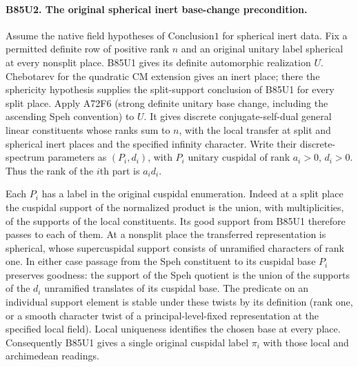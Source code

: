 \paragraph{B85U2. The original spherical inert base-change precondition.}
Assume the native field hypotheses of $\mathrm{Conclusion1}$ for
spherical inert data. Fix a permitted definite row of positive rank
$n$ and an original unitary label spherical at every nonsplit place.
B85U1 gives its definite automorphic realization $U$. Chebotarev for
the quadratic CM extension gives an inert place; there the
sphericity hypothesis supplies the split-support conclusion of
B85U1 for every split place. Apply A72F6 (strong definite unitary
base change, including the ascending Speh convention) to $U$.
It gives discrete conjugate-self-dual general linear constituents
whose ranks sum to $n$, with the local transfer at split and
spherical inert places and the specified infinity character.
Write their discrete-spectrum parameters as $(P_i,d_i)$, with
$P_i$ unitary cuspidal of rank $a_i>0$, $d_i>0$. Thus the rank
of the $i$th part is $a_i d_i$.

Each $P_i$ has a label in the original cuspidal enumeration.
Indeed at a split place the cuspidal support of the normalized
product is the union, with multiplicities, of the supports of the
local constituents. Its good support from B85U1 therefore passes
to each of them. At a nonsplit place the transferred representation
is spherical, whose supercuspidal support consists of unramified
characters of rank one. In either case passage from the Speh
constituent to its cuspidal base $P_i$ preserves goodness: the
support of the Speh quotient is the union of the supports of the
$d_i$ unramified translates of its cuspidal base. The predicate
on an individual support element is stable under these twists by
its definition (rank one, or a smooth character twist of a
principal-level-fixed representation at the specified local field).
Local uniqueness identifies the chosen base at every place.
Consequently B85U1 gives a single original cuspidal label $\pi_i$
with those local and archimedean readings.


